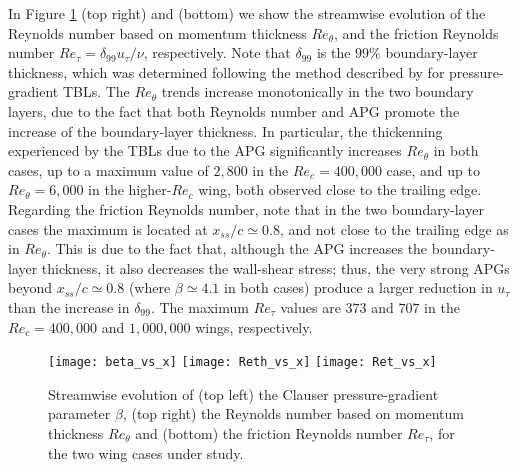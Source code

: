 In Figure \ref{beta_Reth_Ret} (top right) and (bottom) we show the streamwise evolution of the Reynolds number based on momentum thickness $Re_{\theta}$, and the friction Reynolds number $Re_{\tau}=\delta_{99} u_{\tau} / \nu$, respectively. Note that $\delta_{99}$ is the $99\%$ boundary-layer thickness, which was determined following the method described by \cite{vinuesa_diagnostic} for pressure-gradient TBLs. The $Re_{\theta}$ trends increase monotonically in the two boundary layers, due to the fact that both Reynolds number and APG promote the increase of the boundary-layer thickness. In particular, the thickenning experienced by the TBLs due to the APG significantly increases $Re_{\theta}$ in both cases, up to a maximum value of $2,800$ in the $Re_{c}=400,000$ case, and up to $Re_{\theta}=6,000$ in the higher-$Re_{c}$ wing, both observed close to the trailing edge. Regarding the friction Reynolds number, note that in the two boundary-layer cases the maximum is located at $x_{ss} / c\simeq 0.8$, and not close to the trailing edge as in $Re_{\theta}$. This is due to the fact that, although the APG increases the boundary-layer thickness, it also decreases the wall-shear stress; thus, the very strong APGs beyond $x_{ss} /c \simeq 0.8$ (where $\beta \simeq 4.1$ in both cases) produce a larger reduction in $u_{\tau}$ than the increase in $\delta_{99}$. The maximum $Re_{\tau}$ values are $373$ and $707$ in the $Re_{c}=400,000$ and $1,000,000$ wings, respectively.
\begin{figure}[t]
\centering
\texttt{[image: beta\_vs\_x]}
\texttt{[image: Reth\_vs\_x]}
\texttt{[image: Ret\_vs\_x]}
\caption{Streamwise evolution of (top left) the Clauser pressure-gradient parameter $\beta$, (top right) the Reynolds number based on momentum thickness $Re_{\theta}$ and (bottom) the friction Reynolds number $Re_{\tau}$, for the two wing cases under study.}
\label{beta_Reth_Ret}
\end{figure}

